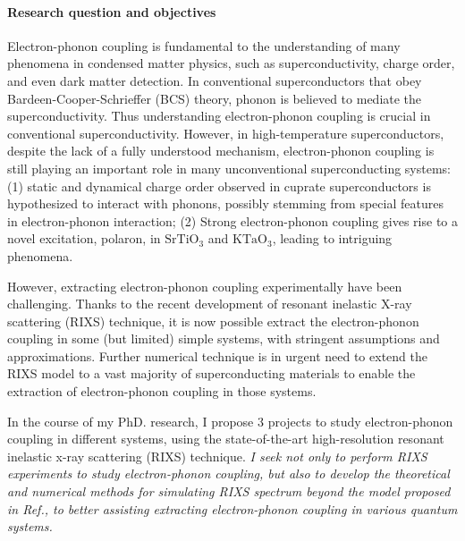 \documentclass[11pt]{article}
\begin{document}
\paragraph{Research question and objectives}
Electron-phonon coupling is fundamental to the understanding of many phenomena in condensed matter physics, such as superconductivity\cite{bardeen_theory_1957,cuk_review_2005}, charge order\cite{arpaia_charge_2021,comin_resonant_2016,tranquada_spins_2013}, and even dark matter detection\cite{griffin_directional_2018}. In conventional superconductors that obey Bardeen-Cooper-Schrieffer (BCS) theory, phonon is believed to mediate the superconductivity\cite{bardeen_theory_1957}. Thus understanding electron-phonon coupling is crucial in conventional superconductivity. However, in high-temperature superconductors, despite the lack of a fully understood mechanism, electron-phonon coupling is still playing an important role in many unconventional superconducting systems: (1) static and dynamical charge order observed in cuprate superconductors is hypothesized to interact with phonons, possibly stemming from special features in electron-phonon interaction\cite{lin_strongly_2020, wang_charge_2021, huang_quantum_2021, miao_incommensurate_2018,tacon_inelastic_2014,li_multiorbital_2020,li_multiorbital_2020,chaix_dispersive_2017,braicovich_determining_2020,huang_quantum_2021}; (2) Strong electron-phonon coupling gives rise to a novel excitation, polaron, in $\mathrm{SrTiO_3}$ and $\mathrm{KTaO_3}$, leading to intriguing phenomena\cite{swartz_polaronic_2018,chen_orientation-dependent_2023}. 

However, extracting electron-phonon coupling experimentally have been challenging. Thanks to the recent development of resonant inelastic X-ray scattering (RIXS) technique, it is now possible extract the electron-phonon coupling in some (but limited) simple systems, with stringent assumptions and approximations\cite{ament_determining_2011}. Further numerical technique is in urgent need to extend the RIXS model to a vast majority of superconducting materials to enable the extraction of electron-phonon coupling in those systems. 

In the course of my PhD. research, I propose 3 projects to study electron-phonon coupling in different systems, using the state-of-the-art high-resolution resonant inelastic x-ray scattering (RIXS) technique\cite{ament_resonant_2011,zhou_i21_2022}. \textit{I seek not only to perform RIXS experiments to study electron-phonon coupling, but also to develop the theoretical and numerical methods for simulating RIXS spectrum beyond the model proposed in Ref.\cite{ament_determining_2011}, to better assisting extracting electron-phonon coupling in various quantum systems.} 
\end{document}
